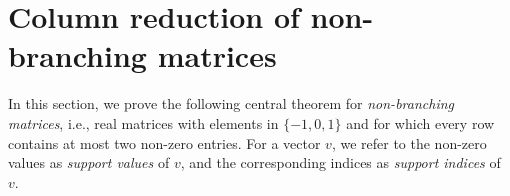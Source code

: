 \documentclass{article}
\theoremstyle{definition}
\newcommand{\KK}{\mathcal{K}}
\newcommand{\LL}{\mathcal{L}}
\begin{document}

\section{Column reduction of non-branching matrices}\label{sec:non_brch_mtx} %
In this section, we prove the following central theorem for \emph{non-branching matrices}, i.e., real matrices with elements in $\{-1,0,1\}$ and for which every row contains at most two non-zero entries.
For a vector $v$,
we refer to the non-zero values as  \emph{support values} of $v$,
and the corresponding indices as \emph{support indices} of $v$. 
\end{document}
